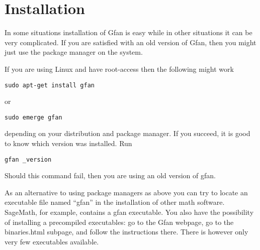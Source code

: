\newpage
\section{Installation}
In some situations installation of Gfan is easy while in other situations it can be very complicated. If you are satisfied with an old version of Gfan, then you might just use the package manager on the system.

If you are using Linux and have root-access then the following might work
\begin{verbatim}
sudo apt-get install gfan
\end{verbatim}
or
\begin{verbatim}
sudo emerge gfan
\end{verbatim}
depending on your distribution and package manager. If you succeed, it is good to know which version was installed. Run
\begin{verbatim}
gfan _version
\end{verbatim} 
Should this command fail, then you are using an old version of gfan.

As an alternative to using package managers as above you can try to locate an executable file named ``gfan'' in the installation of other math software. SageMath, for example, contains a gfan executable. You also have the possibility of installing a precompiled executables: go to the Gfan webpage, go to the binaries.html subpage, and follow the instructions there. There is however only very few executables available.






